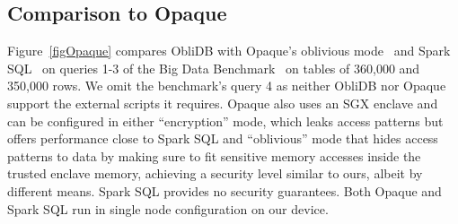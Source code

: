 \documentclass[letterpaper,twocolumn,10pt]{article}
\def\name/{ObliDB}
\begin{document}
\subsection{Comparison to Opaque}

Figure~\ref{figOpaque} compares \name/ with Opaque's oblivious mode~\cite{ZDB+17} and Spark SQL~\cite{SparkSQL} on queries 1-3 of the Big Data Benchmark~\cite{BDB} on tables of 360,000 and 350,000 rows. We omit the benchmark's query 4 as neither \name/ nor Opaque support the external scripts it requires. Opaque also uses an SGX enclave and can be configured in either ``encryption'' mode, which leaks access patterns but offers performance close to Spark SQL and ``oblivious'' mode that hides access patterns to data by making sure to fit sensitive memory accesses inside the trusted enclave memory, achieving a security level similar to ours, albeit by different means. Spark SQL provides no security guarantees. Both Opaque and Spark SQL run in single node configuration on our device.
\end{document}

